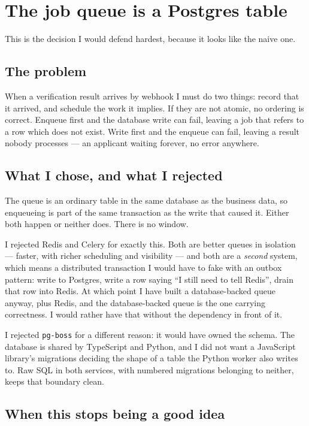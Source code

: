 \documentclass[11pt,a4paper]{article}
\begin{document}
\section{The job queue is a Postgres table}

This is the decision I would defend hardest, because it looks like the naive
one.

\subsection{The problem}

When a verification result arrives by webhook I must do two things: record that
it arrived, and schedule the work it implies. If they are not atomic, no ordering
is correct. Enqueue first and the database write can fail, leaving a job that
refers to a row which does not exist. Write first and the enqueue can fail,
leaving a result nobody processes --- an applicant waiting forever, no error
anywhere.

\subsection{What I chose, and what I rejected}

The queue is an ordinary table in the same database as the business data, so
enqueueing is part of the same transaction as the write that caused it. Either
both happen or neither does. There is no window.

I rejected Redis and Celery for exactly this. Both are better queues in isolation
--- faster, with richer scheduling and visibility --- and both are a \emph{second}
system, which means a distributed transaction I would have to fake with an outbox
pattern: write to Postgres, write a row saying ``I still need to tell Redis'',
drain that row into Redis. At which point I have built a database-backed queue
anyway, plus Redis, and the database-backed queue is the one carrying
correctness. I would rather have that without the dependency in front of it.

I rejected \texttt{pg-boss} for a different reason: it would have owned the
schema. The database is shared by TypeScript and Python, and I did not want a
JavaScript library's migrations deciding the shape of a table the Python worker
also writes to. Raw SQL in both services, with numbered migrations belonging to
neither, keeps that boundary clean.

\subsection{When this stops being a good idea}
\end{document}
